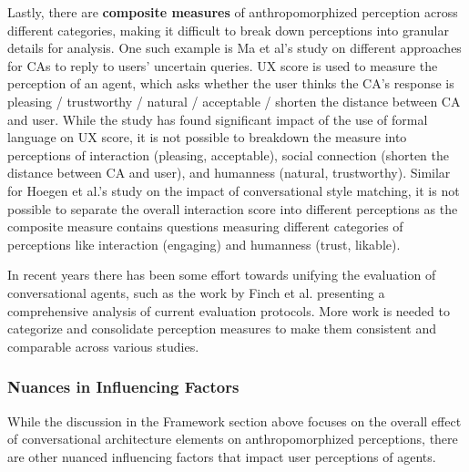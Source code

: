 \documentclass[sigconf,screen,review, anonymous]{acmart}
\newcommand{\cmt}[1]{}%
\begin{document}
Lastly, there are \textbf{composite measures} of anthropomorphized perception across different categories, making it difficult to break down perceptions into granular details for analysis. One such example is Ma et al's study \cite{ma2022ask}\cmt{[29]} on different approaches for CAs to reply to users' uncertain queries. UX score is used to measure the perception of an agent, which asks whether the user thinks the CA's response is pleasing / trustworthy / natural / acceptable / shorten the distance between CA and user. While the study has found significant impact of the use of formal language on UX score, it is not possible to breakdown the measure into perceptions of interaction (pleasing, acceptable), social connection (shorten the distance between CA and user), and humanness (natural, trustworthy). Similar for Hoegen et al.'s study \cite{hoegen2019end}\cmt{[31]} on the impact of conversational style matching, it is not possible to separate the overall interaction score into different perceptions as the composite measure contains questions measuring different categories of perceptions like interaction (engaging) and humanness (trust, likable).

In recent years there has been some effort towards unifying the evaluation of conversational agents, such as the work by Finch et al. \cite{finch2020towards} presenting a comprehensive analysis of current evaluation protocols. More work is needed to categorize and consolidate perception measures to make them consistent and comparable across various studies. 


\subsubsection{Nuances in Influencing Factors}

While the discussion in the Framework section above focuses on the overall effect of conversational architecture elements on anthropomorphized perceptions,  there are other nuanced influencing factors that impact user perceptions of agents. 
\end{document}
